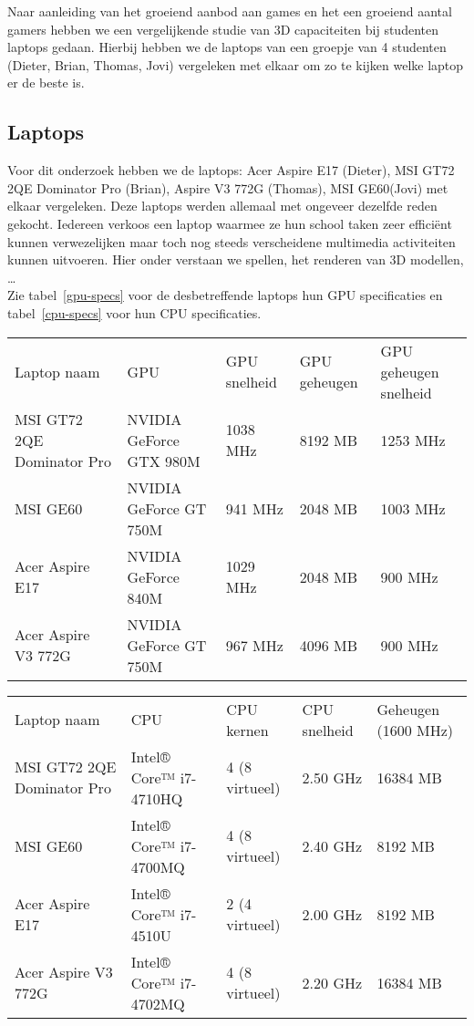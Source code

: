 Naar aanleiding van het groeiend aanbod aan games en het een groeiend aantal gamers hebben we een vergelijkende studie van 3D capaciteiten bij studenten laptops gedaan. Hierbij hebben we de laptops van een groepje van 4 studenten (Dieter, Brian, Thomas, Jovi) vergeleken met elkaar om zo te kijken welke laptop er de beste is. 
\subsection{Laptops}
Voor dit onderzoek hebben we de laptops: Acer Aspire E17 (Dieter), MSI GT72 2QE Dominator Pro (Brian), Aspire V3 772G (Thomas), MSI GE60(Jovi) met elkaar vergeleken. Deze laptops werden allemaal met ongeveer dezelfde reden gekocht. Iedereen verkoos een laptop waarmee ze hun school taken zeer effici{\"e}nt kunnen verwezelijken maar toch nog steeds verscheidene multimedia activiteiten kunnen uitvoeren. Hier onder verstaan we spellen, het renderen van 3D modellen, \dots \\
Zie tabel~\ref{gpu-specs} voor de desbetreffende laptops hun GPU specificaties en tabel~\ref{cpu-specs} voor hun CPU specificaties.
\begin{table*}[t]
\centering
\caption{GPU specificaties}
\label{gpu-specs}
\begin{tabular}{lllll}
Laptop naam                & GPU                     & GPU snelheid & GPU geheugen & GPU geheugen snelheid \\
MSI GT72 2QE Dominator Pro & NVIDIA GeForce GTX 980M & 1038 MHz  & 8192 MB    & 1253 MHz         \\
MSI GE60                   & NVIDIA GeForce GT 750M  & 941 MHz   & 2048 MB    & 1003 MHz          \\
Acer Aspire E17            & NVIDIA GeForce 840M     & 1029 MHz  & 2048 MB    & 900 MHz          \\
Acer Aspire V3 772G             & NVIDIA GeForce GT 750M  & 967 MHz   & 4096 MB    & 900 MHz         
\end{tabular}
\end{table*}
\begin{table*}[t]
\centering
\caption{CPU \& Geheugen specificaties}
\label{cpu-specs}
\begin{tabular}{lllll}
Laptop naam				   & CPU                    & CPU kernen     & CPU snelheid	& Geheugen (1600 MHz)  \\
MSI GT72 2QE Dominator Pro & Intel® Core™ i7-4710HQ & 4 (8 virtueel) & 2.50 GHz	& 16384 MB	\\
MSI GE60                   & Intel® Core™ i7-4700MQ & 4 (8 virtueel) & 2.40 GHz	& 8192 MB	\\
Acer Aspire E17            & Intel® Core™ i7-4510U  & 2 (4 virtueel) & 2.00 GHz	& 8192 MB	\\
Acer Aspire V3 772G             & Intel® Core™ i7-4702MQ & 4 (8 virtueel) & 2.20 GHz	& 16384 MB 
\end{tabular}
\end{table*}